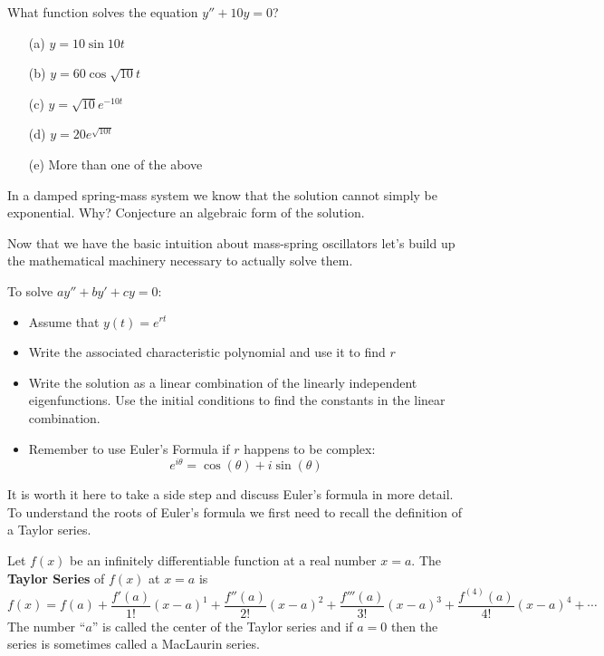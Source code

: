 \begin{problem}
    What function solves the equation $y'' + 10 y =0$?
\begin{enumerate}
    \item[(a)] $y = 10 \sin 10 t$
    \item[(b)] $y = 60 \cos \sqrt{10} t$
    \item[(c)] $y = \sqrt{10} e^{-10 t}$
    \item[(d)] $y = 20 e^{\sqrt{10 t}}$
    \item[(e)] More than one of the above
\end{enumerate}
\end{problem}
%             


\begin{problem}
    In a damped spring-mass system we know that the solution cannot simply be exponential.
    Why?  Conjecture an algebraic form of the solution.
\end{problem}

Now that we have the basic intuition about mass-spring oscillators let's build up the
mathematical machinery necessary to actually solve them.
\begin{technique}\label{tech:second_order_ode}
    To solve $a y'' + by' + c y = 0$:
    \begin{itemize}
        \item Assume that $y(t) = e^{rt}$
        \item Write the associated characteristic polynomial and use it to find $r$
        \item Write the solution as a linear combination of the linearly independent
            eigenfunctions.  Use the initial conditions to find the constants in the
            linear combination.
        \item Remember to use Euler's Formula if $r$ happens to be complex: 
            \[ e^{i\theta} =\cos(\theta) + i\sin(\theta) \]
    \end{itemize}
\end{technique}


It is worth it here to take a side step and discuss Euler's formula in more detail.  To
understand the roots of Euler's formula we first need to recall the definition of a Taylor
series.
\begin{definition}
    Let $f(x)$ be an infinitely differentiable function at a real number $x=a$.  The {\bf
    Taylor Series} of $f(x)$ at $x=a$ is
    \[ f(x) = f(a) + \frac{f'(a)}{1!}(x-a)^1 + \frac{f''(a)}{2!}(x-a)^2
        +\frac{f'''(a)}{3!}(x-a)^3 +\frac{f^{(4)}(a)}{4!}(x-a)^4 + \cdots \]
    The number ``$a$'' is called the center of the Taylor series and if $a=0$ then the
    series is sometimes called a MacLaurin series.
\end{definition}

